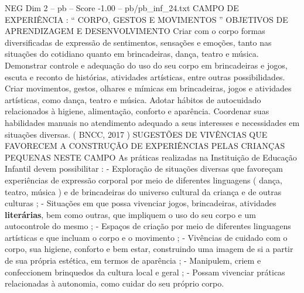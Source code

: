 \begin{textsample}{NEG Dim 2 – pb – Score -1.00 – pb/pb\_inf\_24.txt}  \label{ex:f2_neg_015}
CAMPO DE EXPERIÊNCIA : “ CORPO, GESTOS E MOVIMENTOS ” OBJETIVOS DE APRENDIZAGEM E DESENVOLVIMENTO Criar com o corpo formas diversificadas de expressão de sentimentos, sensações e emoções, tanto nas situações do cotidiano quanto em brincadeiras, dança, teatro e música.
Demonstrar controle e adequação do uso do seu corpo em brincadeiras e jogos, escuta e reconto de histórias, atividades artísticas, entre outras possibilidades.
Criar movimentos, gestos, olhares e mímicas em brincadeiras, jogos e atividades artísticas, como dança, teatro e música.
Adotar hábitos de autocuidado relacionados à higiene, alimentação, conforto e aparência.
Coordenar suas habilidades manuais no atendimento adequado a seus interesses e necessidades em situações diversas. ( BNCC, 2017 ) SUGESTÕES DE VIVÊNCIAS QUE FAVORECEM A CONSTRUÇÃO DE EXPERIÊNCIAS PELAS CRIANÇAS PEQUENAS NESTE CAMPO As práticas realizadas na Instituição de Educação Infantil devem possibilitar : - Exploração de situações diversas que favoreçam experiências de expressão corporal por meio de diferentes linguagens ( dança, teatro, música ) e de brincadeiras do universo cultural da criança e de outras culturas ; - Situações em que possa vivenciar jogos, brincadeiras, atividades \textbf{literárias}, bem como outras, que impliquem o uso do seu corpo e um autocontrole do mesmo ; - Espaços de criação por meio de diferentes linguagens artísticas e que incluam o corpo e o movimento ; - Vivências de cuidado com o corpo, sua higiene, conforto e bem estar, construindo uma imagem de si a partir de sua própria estética, em termos de aparência ; - Manipulem, criem e confeccionem brinquedos da cultura local e geral ; - Possam vivenciar práticas relacionadas à autonomia, como cuidar do seu próprio corpo.

\end{textsample}
